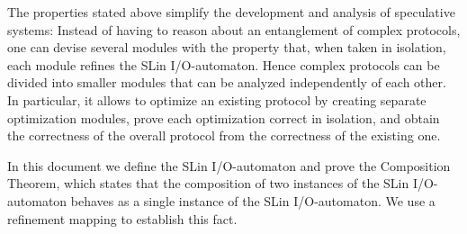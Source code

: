 The properties stated above simplify the development and analysis of speculative
systems: Instead of having to reason about an entanglement of complex protocols,
one can devise several modules with the property that, when taken in isolation,
each module refines the SLin I/O-automaton. Hence complex protocols can be
divided into smaller modules that can be analyzed independently of each other.
In particular, it allows to optimize an existing protocol by creating separate
optimization modules, prove each optimization correct in isolation, and obtain
the correctness of the overall protocol from the correctness of the existing
one.

In this document we define the SLin I/O-automaton and prove the Composition
Theorem, which states that the composition of two instances of the SLin
I/O-automaton behaves as a single instance of the SLin I/O-automaton. We use a
refinement mapping to establish this fact.

